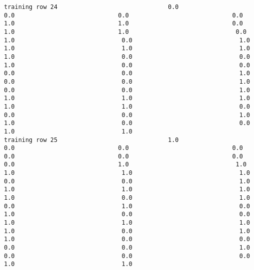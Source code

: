 \documentclass[11pt]{article}
\begin{document}
\begin{verbatim}
training row 24                               0.0                             0.0                             0.0                             0.0                             1.0                             1.0                             0.0                             1.0                             1.0                              0.0                              1.0                              0.0                              1.0                              1.0                              1.0                              1.0                              1.0                              0.0                              0.0                              1.0                              0.0                              0.0                              0.0                              0.0                              1.0                              0.0                              0.0                              1.0                              0.0                              0.0                              1.0                              1.0                              1.0                              1.0                              1.0                              1.0                              0.0                              0.0                              0.0                              1.0                              1.0                              0.0                              0.0                              1.0                              1.0
training row 25                               1.0                             0.0                             0.0                             0.0                             0.0                             0.0                             0.0                             0.0                             1.0                              1.0                              1.0                              1.0                              1.0                              0.0                              0.0                              1.0                              1.0                              1.0                              1.0                              1.0                              0.0                              1.0                              0.0                              1.0                              0.0                              1.0                              0.0                              0.0                              1.0                              1.0                              1.0                              1.0                              0.0                              1.0                              1.0                              0.0                              0.0                              0.0                              0.0                              1.0                              0.0                              0.0                              0.0                              1.0                              1.0

\end{verbatim}
\end{document}
